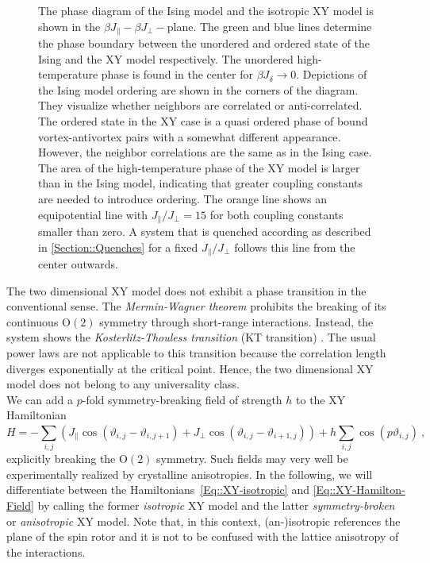 	\begin{figure}
		\centering
		
		\caption{The phase diagram of the Ising model and the isotropic XY model is shown in the $\beta J_\parallel-\beta J_\perp-$plane. The green and blue lines determine the phase boundary between the unordered and ordered state of the Ising and the XY model respectively. The unordered high-temperature phase is found in the center for $\beta J_\delta \rightarrow 0$. Depictions of the Ising model ordering are shown in the corners of the diagram. They visualize whether neighbors are correlated or anti-correlated. The ordered state in the XY case is a quasi ordered phase of bound vortex-antivortex pairs with a somewhat different appearance. However, the neighbor correlations are the same as in the Ising case. The area of the high-temperature phase of the XY model is larger than in the Ising model, indicating that greater coupling constants are needed to introduce ordering. The orange line shows an equipotential line with $J_\parallel /	J_\perp =	15$ for both coupling constants smaller than zero. A system that is quenched according as described in \autoref{Section::Quenches} for a fixed $J_\parallel /	J_\perp$ follows this line from the center outwards.}
		\label{Fig::XY-Ising-PD}
	\end{figure}
	
	The two dimensional XY model does not exhibit a phase transition in the conventional sense. The \textit{Mermin-Wagner theorem} \cite{mermin1966absence} prohibits the breaking of its continuous $\text{O}(2)$ symmetry through short-range interactions. Instead, the system shows the \textit{Kosterlitz-Thouless transition} (KT transition) \cite{JMKosterlitz_1973, berezinskii1971destruction}. The usual power laws are not applicable to this transition because the correlation length diverges exponentially at the critical point. Hence, the two dimensional XY model does not belong to any universality class. \\
	
	We can add a $p$-fold symmetry-breaking field of strength $h$ to the XY Hamiltonian
	\begin{equation} \label{Eq::XY-Hamilton-Field}
		H =- \sum_{i,j}^{} \left(J_\parallel  \cos \left(\vartheta_{i,j} - \vartheta_{i, j+1} \right) + J_\perp  \cos \left(\vartheta_{i,j} - \vartheta_{i+1, j} \right) \right)	+ h \sum_{i,j} \cos(p\vartheta_{i,j}) ~,
	\end{equation}
	explicitly breaking the $\text{O}(2)$ symmetry. Such fields may very well be experimentally realized by crystalline anisotropies. In the following, we will differentiate between the Hamiltonians~\eqref{Eq::XY-isotropic} and \eqref{Eq::XY-Hamilton-Field} by calling the former \textit{isotropic} XY model and the latter \textit{symmetry-broken} or \textit{anisotropic} XY model. Note that, in this context, (an-)isotropic references the plane of the spin rotor and it is not to be confused with the lattice anisotropy of the interactions. \\
	

